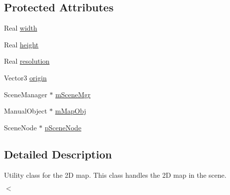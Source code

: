 \subsection*{\-Protected \-Attributes}
\begin{DoxyCompactItemize}
\item 
\-Real \hyperlink{classGlobalMap_adbd369e87c136942c600d7675595ebd7}{width}
\item 
\-Real \hyperlink{classGlobalMap_a8c44af901d0f19fb8a57845d03e24063}{height}
\item 
\-Real \hyperlink{classGlobalMap_a0bfaceb4b03dd0c79179f627565d3a8a}{resolution}
\item 
\-Vector3 \hyperlink{classGlobalMap_a79a33b5d851acd03cff2d74b1aaaf020}{origin}
\item 
\-Scene\-Manager $\ast$ \hyperlink{classGlobalMap_a58e2848e9c5f3abe6effaf12176c2c8e}{m\-Scene\-Mgr}
\item 
\-Manual\-Object $\ast$ \hyperlink{classGlobalMap_a59b1001eec405852745ecf64a47915be}{m\-Map\-Obj}
\item 
\-Scene\-Node $\ast$ \hyperlink{classGlobalMap_a3ef2cbe2c69a7257fbf17ef338e679c1}{p\-Scene\-Node}
\end{DoxyCompactItemize}


\subsection{\-Detailed \-Description}
\-Utility class for the 2\-D map. \-This class handles the 2\-D map in the scene. 

$<$ 

